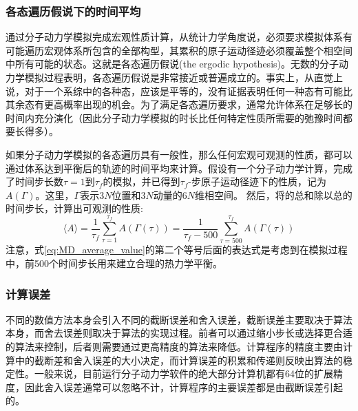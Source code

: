 \subsubsection{各态遍历假说下的时间平均}
通过分子动力学模拟完成宏观性质计算，从统计力学角度说，必须要求模拟体系有可能遍历宏观体系所包含的全部构型，其累积的原子运动径迹必须覆盖整个相空间中所有可能的状态。这就是各态遍历假说\textrm{(the ergodic hypothesis)}。无数的分子动力学模拟过程表明，各态遍历假说是非常接近或普遍成立的。事实上，从直觉上说，对于一个系综中的各种态，应该是平等的，没有证据表明任何一种态有可能比其余态有更高概率出现的机会。为了满足各态遍历要求，通常允许体系在足够长的时间内充分演化（因此分子动力学模拟的时长比任何特定性质所需要的弛豫时间都要长得多）。

如果分子动力学模拟的各态遍历具有一般性，那么任何宏观可观测的性质，都可以通过体系达到平衡后的轨迹的时间平均来计算。假设有一个分子动力学计算，完成了时间步长数$\tau=1$到$\tau_f$的模拟，并已得到$\tau_f$-步原子运动径迹下的性质，记为$A(\Gamma)$。这里，$\Gamma$表示3$N$位置和3$N$动量的6$N$维相空间。
然后，将的总和除以总的时间步长，计算出可观测的性质:
\begin{equation}
	\langle A\rangle=\dfrac1{\tau_f}\sum_{\tau=1}^{\tau_f}A(\Gamma(\tau))=\dfrac1{\tau_f-500}\sum_{\tau=500}^{\tau_f}A(\Gamma(\tau))
	\label{eq:MD_average_value}
\end{equation}
注意，式\eqref{eq:MD_average_value}的第二个等号后面的表达式是考虑到在模拟过程中，前500个时间步长用来建立合理的热力学平衡。%
\subsubsection{计算误差}
不同的数值方法本身会引入不同的截断误差和舍入误差，截断误差主要取决于算法本身，而舍去误差则取决于算法的实现过程。前者可以通过缩小步长或选择更合适的算法来控制，后者则需要通过更高精度的算法来降低。计算程序的精度主要由计算中的截断差和舍入误差的大小决定，而计算误差的积累和传递则反映出算法的稳定性。一般来说，目前运行分子动力学软件的绝大部分计算机都有64位的扩展精度，因此舍入误差通常可以忽略不计，计算程序的主要误差都是由截断误差引起的。
